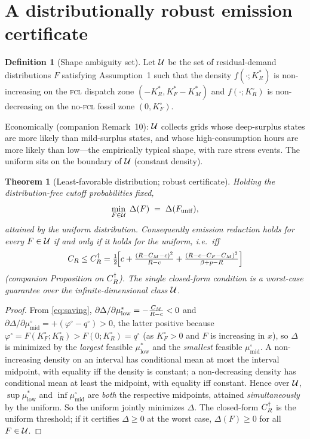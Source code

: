 \documentclass[11pt,reqno]{amsart}
\theoremstyle{plain}
\newtheorem{theorem}{Theorem}\newtheorem{proposition}{Proposition}
\theoremstyle{definition}\newtheorem{definition}{Definition}\newtheorem{assumption}{Assumption}
\theoremstyle{remark}\newtheorem{remark}{Remark}
\newcommand{\KRs}{K_R^{*}}\newcommand{\KFs}{K_F^{*}}\newcommand{\KMs}{K_M^{*}}
\newcommand{\KRo}{K_R^{\circ}}\newcommand{\KFo}{K_F^{\circ}}
\begin{document}
\section{A distributionally robust emission certificate}\label{sec:robust}

\begin{definition}[Shape ambiguity set]\label{def:U}
Let $\mathcal U$ be the set of residual-demand distributions $F$ satisfying
Assumption~1 such that the density $f(\cdot;\KRs)$ is non-increasing on the
\textsc{fcl} dispatch zone $(-\KRs,\KFs-\KMs)$ and $f(\cdot;\KRo)$ is
non-decreasing on the no-\textsc{fcl} fossil zone $(0,\KFo)$.
\end{definition}

Economically (companion Remark~10): $\mathcal U$ collects grids whose deep-surplus
states are more likely than mild-surplus states, and whose high-consumption hours
are more likely than low---the empirically typical shape, with rare stress events.
The uniform sits on the boundary of $\mathcal U$ (constant density).

\begin{theorem}[Least-favorable distribution; robust certificate]\label{thm:robust}
Holding the distribution-free cutoff probabilities fixed,
\[
  \min_{F\in\mathcal U}\;\Delta(F)\;=\;\Delta(F_{\mathrm{unif}}),
\]
attained by the uniform distribution. Consequently emission reduction holds for
\emph{every} $F\in\mathcal U$ if and only if it holds for the uniform, i.e.\ iff
\[
  C_R\le C_R^{\dagger}
  =\tfrac12\!\Big[c+\tfrac{(R-C_M-c)^2}{R-c}+\tfrac{(R-c-C_F-C_M)^2}{\beta+p-R}\Big]
\]
(companion Proposition on $C_R^{\dagger}$). The single closed-form condition is a
worst-case guarantee over the infinite-dimensional class $\mathcal U$.
\end{theorem}

\begin{proof}
From \eqref{eq:saving},
$\partial\Delta/\partial\mu^{*}_{\mathrm{low}}=-\tfrac{C_M}{R-c}<0$ and
$\partial\Delta/\partial\mu^{\circ}_{\mathrm{mid}}=+(\varphi^{\circ}-q^{\circ})>0$,
the latter positive because $\varphi^{\circ}=F(\KFo;\KRo)>F(0;\KRo)=q^{\circ}$ (as
$\KFo>0$ and $F$ is increasing in $x$),
so $\Delta$ is minimized by the \emph{largest} feasible $\mu^{*}_{\mathrm{low}}$
and the \emph{smallest} feasible $\mu^{\circ}_{\mathrm{mid}}$. A non-increasing
density on an interval has conditional mean at most the interval midpoint, with
equality iff the density is constant; a non-decreasing density has conditional
mean at least the midpoint, with equality iff constant. Hence over $\mathcal U$,
$\sup\mu^{*}_{\mathrm{low}}$ and $\inf\mu^{\circ}_{\mathrm{mid}}$ are \emph{both}
the respective midpoints, attained \emph{simultaneously} by the uniform. So the
uniform jointly minimizes $\Delta$. The closed-form $C_R^{\dagger}$ is the uniform
threshold; if it certifies $\Delta\ge0$ at the worst case, $\Delta(F)\ge0$ for all
$F\in\mathcal U$.
\end{proof}
\end{document}
